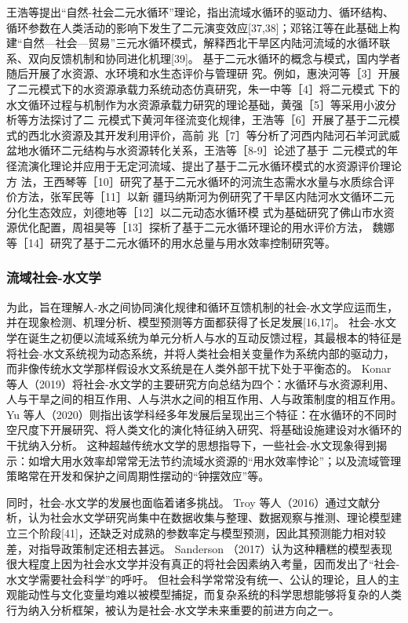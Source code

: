 王浩等提出“自然-社会二元水循环”理论，指出流域水循环的驱动力、循环结构、循环参数在人类活动的影响下发生了二元演变效应[37,38]；邓铭江等在此基础上构建“自然—社会—贸易”三元水循环模式，解释西北干旱区内陆河流域的水循环联系、双向反馈机制和协同进化机理[39]。
% 
基于二元水循环的概念与模式，国内学者随后开展了水资源、水环境和水生态评价与管理研 究。例如，惠泱河等［3］开展了二元模式下的水资源承载力系统动态仿真研究，朱一中等［4］将二元模式 下的水文循环过程与机制作为水资源承载力研究的理论基础，黄强［5］等采用小波分析等方法探讨了二 元模式下黄河年径流变化规律，王浩等［6］开展了基于二元模式的西北水资源及其开发利用评价，高前 兆［7］等分析了河西内陆河石羊河武威盆地水循环二元结构与水资源转化关系，王浩等［8-9］论述了基于 二元模式的年径流演化理论并应用于无定河流域、提出了基于二元水循环模式的水资源评价理论方 法，王西琴等［10］研究了基于二元水循环的河流生态需水水量与水质综合评价方法，张军民等［11］以新 疆玛纳斯河为例研究了干旱区内陆河水文循环二元分化生态效应，刘德地等［12］以二元动态水循环模 式为基础研究了佛山市水资源优化配置，周祖昊等［13］探析了基于二元水循环理论的用水评价方法， 魏娜等［14］研究了基于二元水循环的用水总量与用水效率控制研究等。

\subsubsection*{流域社会-水文学}

为此，旨在理解人-水之间协同演化规律和循环互馈机制的社会-水文学应运而生，并在现象检测、机理分析、模型预测等方面都获得了长足发展[16,17]。
社会-水文学在诞生之初便以流域系统为单元分析人与水的互动反馈过程，其最根本的特征是将社会-水文系统视为动态系统，并将人类社会相关变量作为系统内部的驱动力，而非像传统水文学那样假设水文系统是在人类外部干扰下处于平衡态的\cite{sivapalan2012}。
Konar 等人（2019）将社会-水文学的主要研究方向总结为四个：水循环与水资源利用、人与干旱之间的相互作用、人与洪水之间的相互作用、人与政策制度的相互作用\cite{konar2019}。
Yu 等人（2020）则指出该学科经多年发展后呈现出三个特征：在水循环的不同时空尺度下开展研究、将人类文化的演化特征纳入研究、将基础设施建设对水循环的干扰纳入分析\cite{yu2020}。
这种超越传统水文学的思想指导下，一些社会-水文现象得到揭示：如增大用水效率却常常无法节约流域水资源的“用水效率悖论”；以及流域管理策略常在开发和保护之间周期性摆动的“钟摆效应”等。 %

同时，社会-水文学的发展也面临着诸多挑战。
Troy 等人（2016）通过文献分析，认为社会水文学研究尚集中在数据收集与整理、数据观察与推测、理论模型建立三个阶段[41]，还缺乏对成熟的参数率定与模型预测，因此其预测能力相对较差，对指导政策制定还相去甚远。  %
Sanderson （2017）\cite{sanderson2017}认为这种糟糕的模型表现很大程度上因为社会水文学并没有真正的将社会因素纳入考量，因而发出了“社会-水文学需要社会科学”的呼吁。
但社会科学常常没有统一、公认的理论，且人的主观能动性与文化变量均难以被模型捕捉，而复杂系统的科学思想能够将复杂的人类行为纳入分析框架，被认为是社会-水文学未来重要的前进方向之一\cite{ahlstrom2021}。

